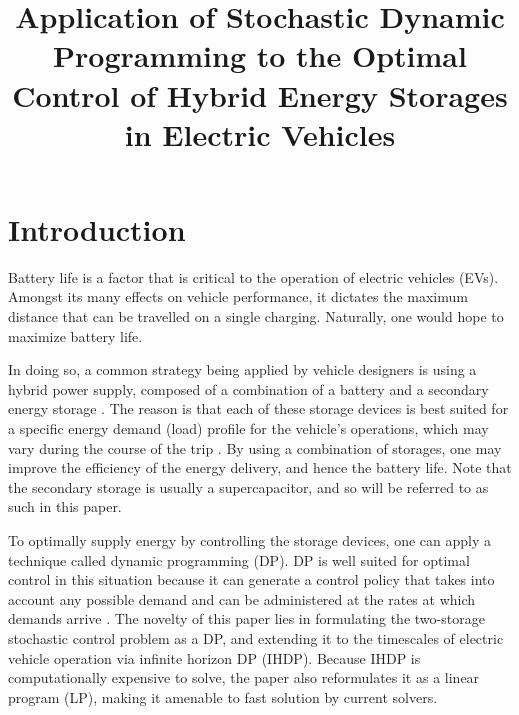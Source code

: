 \documentclass[conference]{IEEEtran}
\begin{document}
\title{Application of Stochastic Dynamic Programming to the Optimal Control of Hybrid Energy Storages in Electric Vehicles}

\author{
}


\maketitle


\section{Introduction}
Battery life is a factor that is critical to the operation of electric vehicles (EVs). Amongst its many effects on vehicle performance, it dictates the maximum distance that can be travelled on a single charging. Naturally, one would hope to maximize battery life.

In doing so, a common strategy being applied by vehicle designers is using a hybrid power supply, composed of a combination of a battery and a secondary energy storage \cite{thounthong2009energy}. The reason is that each of these storage devices is best suited for a specific energy demand (load) profile for the vehicle's operations, which may vary during the course of the trip \cite{thounthong2009energy}. By using a combination of storages, one may improve the efficiency of the energy delivery, and hence the battery life. Note that the secondary storage is usually a supercapacitor, and so will be referred to as such in this paper.

To optimally supply energy by controlling the storage devices, one can apply a technique called dynamic programming (DP). DP is well suited for optimal control in this situation because it can generate a control policy that takes into account any possible demand and can be administered at the rates at which demands arrive \cite{6183284}. The novelty of this paper lies in formulating the two-storage stochastic control problem as a DP, and extending it to the timescales of electric vehicle operation via infinite horizon DP (IHDP). Because IHDP is computationally expensive to solve, the paper also reformulates it as a linear program (LP), making it amenable to fast solution by current solvers. 
\end{document}
